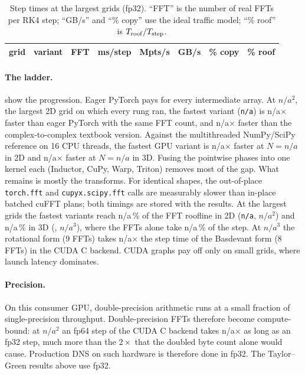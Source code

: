 \documentclass[11pt]{article}
\providecommand{\bestThreeFFTshare}{n/a}
\providecommand{\bestThreeN}{n/a}
\providecommand{\bestThreeRoof}{n/a}
\providecommand{\bestTwoN}{n/a}
\providecommand{\bestTwoName}{n/a}
\providecommand{\bestTwoRoof}{n/a}
\providecommand{\cpuTwoN}{n/a}
\providecommand{\cpuThreeN}{n/a}
\providecommand{\speedupThreeCPU}{n/a}
\providecommand{\fpRatioTwo}{n/a}
\providecommand{\fpRatioTwoN}{n/a}
\providecommand{\ladderTwoN}{n/a}
\providecommand{\ladderTwoName}{n/a}
\providecommand{\rotN}{n/a}
\providecommand{\rotOverBasd}{n/a}
\providecommand{\speedupTwoCPU}{n/a}
\providecommand{\speedupTwoEager}{n/a}
\providecommand{\speedupTwoTextbook}{n/a}
\providecommand{\perfTableRows}{}
\begin{document}
\begin{table}[!htb]
\centering
\footnotesize
\caption{Step times at the largest grids (fp32). ``FFT'' is the number of real FFTs per RK4 step;
``GB/s'' and ``\% copy'' use the ideal traffic model; ``\% roof'' is $T_{\rm roof}/T_{\rm step}$.}
\label{tab:perf}
\begin{tabular}{llrrrrrr}
\toprule
grid & variant & FFT & ms/step & Mpts/s & GB/s & \% copy & \% roof\\
\midrule
\perfTableRows
\bottomrule
\end{tabular}
\end{table}

\paragraph{The ladder.}  show the progression. Eager PyTorch
pays for every intermediate array. At $\ladderTwoN^2$, the largest 2D grid on which every rung
ran, the fastest variant (\texttt{\ladderTwoName}) is \speedupTwoEager$\times$ faster than eager PyTorch with the same FFT count, and
\speedupTwoTextbook$\times$ faster than the complex-to-complex textbook version. Against the
multithreaded NumPy/SciPy reference on 16 CPU threads, the fastest GPU variant is
\speedupTwoCPU$\times$ faster at $N=\cpuTwoN$ in 2D and \speedupThreeCPU$\times$ faster at
$N=\cpuThreeN$ in 3D. Fusing the pointwise phases into one kernel each (Inductor, CuPy, Warp,
Triton) removes most of the gap. What remains is mostly the transforms. For identical shapes,
the out-of-place \texttt{torch.fft} and \texttt{cupyx.scipy.fft} calls are measurably slower
than in-place batched cuFFT plans; both timings are stored with the results. At the largest grids the
fastest variants reach \bestTwoRoof\,\% of the FFT roofline in 2D (\texttt{\bestTwoName},
$\bestTwoN^2$) and \bestThreeRoof\,\% in 3D (\texttt{\bestThreeName}, $\bestThreeN^3$), where
the FFTs alone take \bestThreeFFTshare\,\% of the step. At $\rotN^3$ the rotational form (9 FFTs) takes \rotOverBasd$\times$ the step time of the
Basdevant form (8 FFTs) in the CUDA C backend. CUDA graphs pay off only on small grids, where launch
latency dominates.

\paragraph{Precision.} On this consumer GPU, double-precision arithmetic runs at a small fraction
of single-precision throughput. Double-precision FFTs therefore become compute-bound: at
$\fpRatioTwoN^2$ an fp64 step of the CUDA C backend takes \fpRatioTwo$\times$ as long as an fp32
step, much more than the $2\times$ that the doubled byte count alone would cause. Production DNS on such hardware is therefore done in fp32. The
Taylor--Green results above use fp32.
\end{document}
